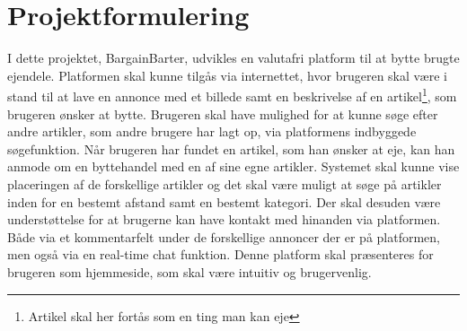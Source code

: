 \chapter{Projektformulering}

I dette projektet, BargainBarter, udvikles en valutafri platform til at bytte brugte ejendele. Platformen skal kunne tilgås via internettet, hvor brugeren skal være i stand til at lave en annonce med et billede samt en beskrivelse af en artikel\footnote{Artikel skal her fortås som en ting man kan eje}, som brugeren ønsker at bytte. Brugeren skal have mulighed for at kunne søge efter andre artikler, som andre brugere har lagt op, via platformens indbyggede søgefunktion. Når brugeren har fundet en artikel, som han ønsker at eje, kan han anmode om en byttehandel med en af sine egne artikler.  
Systemet skal kunne vise placeringen af de forskellige artikler og det skal være muligt at søge på artikler inden for en bestemt afstand samt en bestemt kategori.     
Der skal desuden være understøttelse for at brugerne kan have kontakt med hinanden via platformen. Både via et kommentarfelt under de forskellige annoncer der er på platformen, men også via en real-time chat funktion.
\noindent Denne platform skal præsenteres for brugeren som hjemmeside, som skal være intuitiv og brugervenlig. 